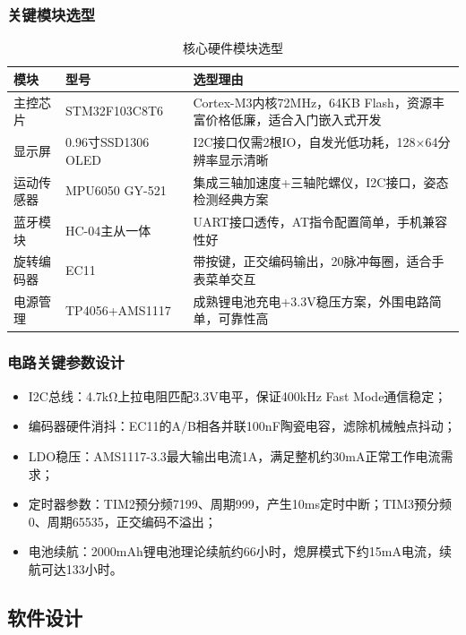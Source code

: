 \documentclass[12pt, a4paper]{ctexart}
\begin{document}
\subsubsection{关键模块选型}
\begin{table}[htbp]
\centering
\caption{核心硬件模块选型}
\label{tab:hw_select}
\begin{tabular}{lll}
\toprule
模块 & 型号 & 选型理由 \\
\midrule
主控芯片 & STM32F103C8T6 & Cortex-M3内核72MHz，64KB Flash，资源丰富价格低廉，适合入门嵌入式开发 \\
显示屏 & 0.96寸SSD1306 OLED & I2C接口仅需2根IO，自发光低功耗，128×64分辨率显示清晰 \\
运动传感器 & MPU6050 GY-521 & 集成三轴加速度+三轴陀螺仪，I2C接口，姿态检测经典方案 \\
蓝牙模块 & HC-04主从一体 & UART接口透传，AT指令配置简单，手机兼容性好 \\
旋转编码器 & EC11 & 带按键，正交编码输出，20脉冲每圈，适合手表菜单交互 \\
电源管理 & TP4056+AMS1117 & 成熟锂电池充电+3.3V稳压方案，外围电路简单，可靠性高 \\
\bottomrule
\end{tabular}
\end{table}

\subsubsection{电路关键参数设计}
\begin{itemize}
    \item I2C总线：4.7kΩ上拉电阻匹配3.3V电平，保证400kHz Fast Mode通信稳定；
    \item 编码器硬件消抖：EC11的A/B相各并联100nF陶瓷电容，滤除机械触点抖动；
    \item LDO稳压：AMS1117-3.3最大输出电流1A，满足整机约30mA正常工作电流需求；
    \item 定时器参数：TIM2预分频7199、周期999，产生10ms定时中断；TIM3预分频0、周期65535，正交编码不溢出；
    \item 电池续航：2000mAh锂电池理论续航约66小时，熄屏模式下约15mA电流，续航可达133小时。
\end{itemize}

\subsection{软件设计}
\end{document}

